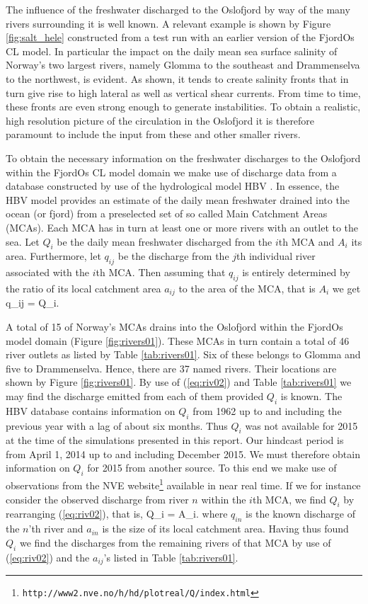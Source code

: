 The influence of the freshwater discharged to the Oslofjord by way of the many rivers surrounding it is well known. A relevant example is shown by Figure \ref{fig:salt_hele} constructed from a test run with an earlier version of the FjordOs CL model. In particular the impact on the daily mean sea surface salinity of Norway's two largest rivers, namely Glomma to the southeast and Drammenselva to the northwest, is evident. As shown, it tends to create salinity fronts that in turn give rise to high lateral as well as vertical shear currents. From time to time, these fronts are even strong enough to generate instabilities. To obtain a realistic, high resolution picture of the circulation in the Oslofjord it is therefore paramount to include the input from these and other smaller rivers.
 

To obtain the necessary information on the freshwater discharges to the Oslofjord within the FjordOs CL model domain we make use of discharge data from a database constructed by use of the hydrological model HBV \citep{beldr:etal:2003}. In essence, the HBV model provides an estimate of the daily mean freshwater drained into the ocean (or fjord) from a preselected set of so called Main Catchment Areas (MCAs). Each MCA has in turn at least one or more rivers with an outlet to the sea. Let $Q_i$ be the daily mean freshwater discharged from the $i$th MCA and $A_i$ its area. Furthermore, let $q_{ij}$ be the discharge from the $j$th individual river associated with the $i$th MCA. Then assuming that $q_{ij}$ is entirely determined by the ratio of its local catchment area $a_{ij}$ to the area of the MCA, that is $A_i$ we get
\be
 \label{eq:riv02}
  q_{ij} =  Q_i.
\ee

A total of 15 of Norway's MCAs drains into the Oslofjord within the FjordOs model domain (Figure \ref{fig:rivers01}). These MCAs in turn contain a total of 46 river outlets as listed by Table \ref{tab:rivers01}. Six of these belongs to Glomma and five to Drammenselva. Hence, there are 37 named rivers. Their locations are shown by Figure \ref{fig:rivers01}. By use of (\ref{eq:riv02}) and Table \ref{tab:rivers01} we may find the discharge emitted from each of them provided $Q_i$ is known. The HBV database contains information on $Q_i$ from 1962 up to and including the previous year with a lag of about six months. Thus $Q_i$ was not available for 2015 at the time of the simulations presented in this report. Our hindcast period is from April 1, 2014 up to and including December 2015. We must therefore obtain information on $Q_i$ for 2015 from another source. To this end we make use of observations from the NVE website\footnote{\texttt{http://www2.nve.no/h/hd/plotreal/Q/index.html}} available in near real time. If we for instance consider the observed discharge from river $n$ within the $i$th MCA, we find $Q_i$ by rearranging (\ref{eq:riv02}), that is,
\be
 \label{eq:riv03}
  Q_i = A_i.
\ee
where $q_{in}$ is the known discharge of the $n$'th river and $a_{in}$ is the size of its local catchment area. Having thus found $Q_i$ we find the discharges from the remaining rivers of that MCA by use of (\ref{eq:riv02}) and the $a_{ij}$'s listed in Table \ref{tab:rivers01}.

